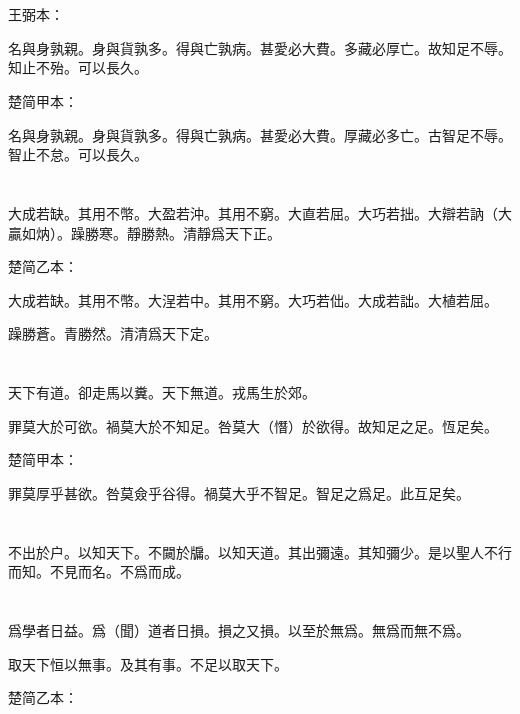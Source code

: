 \documentclass[a5paper]{ctexbook}
\begin{document}
    \chapter{}
    王弼本：

    名與身孰親。身與貨孰多。得與亡孰病。甚愛必大費。多藏必厚亡。故知足不辱。知止不殆。可以長久。

    楚简甲本：

    名與身孰親。身與貨孰多。得與亡孰病。甚愛必大費。厚藏必多亡。古智足不辱。智止不怠。可以長久。

    \chapter{}

    大成若缺。其用不幣。大盈若沖。其用不窮。大直若屈。大巧若拙。大辯若訥（大贏如㶧）。躁勝寒。靜勝熱。清靜爲天下正。

    楚简乙本：

    大成若缺。其用不幣。大浧若中。其用不窮。大巧若㑁。大成若詘。大植若屈。

    躁勝蒼。青勝然。清清爲天下定。

    \chapter{}

    天下有道。卻走馬以糞。天下無道。戎馬生於郊。
    
    罪莫大於可欲。禍莫大於不知足。咎莫大（憯）於欲得。故知足之足。恆足矣。

    楚简甲本：

    罪莫厚乎甚欲。咎莫僉乎谷得。禍莫大乎不智足。智足之爲足。此互足矣。

    \chapter{}

    不出於户。以知天下。不闚於牖。以知天道。其出彌遠。其知彌少。是以聖人不行而知。不見而名。不爲而成。

    \chapter{}

    爲學者日益。爲（聞）道者日損。損之又損。以至於無爲。無爲而無不爲。
    
    取天下恒以無事。及其有事。不足以取天下。

    楚简乙本：
\end{document}
